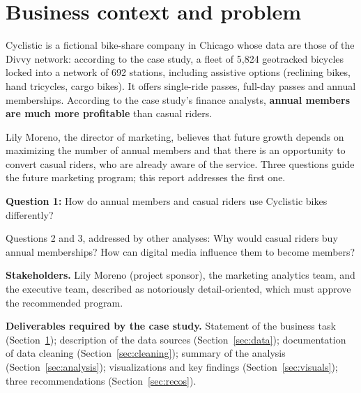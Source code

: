 \section{Business context and problem}
\label{sec:context}

Cyclistic is a fictional bike-share company in Chicago whose data are those of the Divvy network: according to the case study, a fleet of 5,824 geotracked bicycles locked into a network of 692 stations, including assistive options (reclining bikes, hand tricycles, cargo bikes).
It offers single-ride passes, full-day passes and annual memberships.
According to the case study's finance analysts, \textbf{annual members are much more profitable} than casual riders.

Lily Moreno, the director of marketing, believes that future growth depends on maximizing the number of annual members and that there is an opportunity to convert casual riders, who are already aware of the service.
Three questions guide the future marketing program; this report addresses the first one.

\begin{keybox}
\textbf{Question 1:} How do annual members and casual riders use Cyclistic bikes differently?\par
\smallskip
\textcolor{muted}{Questions 2 and 3, addressed by other analyses: Why would casual riders buy annual memberships? How can digital media influence them to become members?}
\end{keybox}

\textbf{Stakeholders.} Lily Moreno (project sponsor), the marketing analytics team, and the executive team, described as notoriously detail-oriented, which must approve the recommended program.

\textbf{Deliverables required by the case study.} Statement of the business task (Section~\ref{sec:context}); description of the data sources (Section~\ref{sec:data}); documentation of data cleaning (Section~\ref{sec:cleaning}); summary of the analysis (Section~\ref{sec:analysis}); visualizations and key findings (Section~\ref{sec:visuals}); three recommendations (Section~\ref{sec:recos}).
